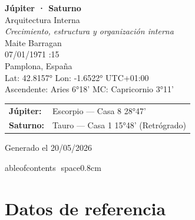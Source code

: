 \documentclass[11pt,a4paper]{article}
\begin{document}

\begin{titlepage}
\centering

\vspace*{2cm}

{\Huge\bfseries\color{azulai} Júpiter · Saturno}\\[0.4cm]

{\large\color{grisai} Arquitectura Interna}\\[0.25cm]

{\small\itshape\color{grisai}
Crecimiento, estructura y organización interna
}\\[1.8cm]

{\huge\color{doradoai} Maite Barragan}\\[1.2cm]

{\Large 07/01/1971 :15}\\[0.25cm]

{\Large Pamplona, España}\\[0.25cm]

{\normalsize
Lat: 42.8157° \quad
Lon: -1.6522° \quad
UTC+01:00
}\\[0.4cm]

{\normalsize
Ascendente: Aries 6°18'
\quad
MC: Capricornio 3°11'
}\\[1.6cm]

\begin{tabular}{ll}
\textbf{Júpiter:} & Escorpio — Casa 8 28°47' \\
\textbf{Saturno:} & Tauro — Casa 1 15°48' (Retrógrado) \\
\end{tabular}

\vfill

{\small\color{grisai}
Generado el 20/05/2026
}

\end{titlepage}

	ableofcontents
space{0.8cm}


\section{Datos de referencia}
\end{document}
